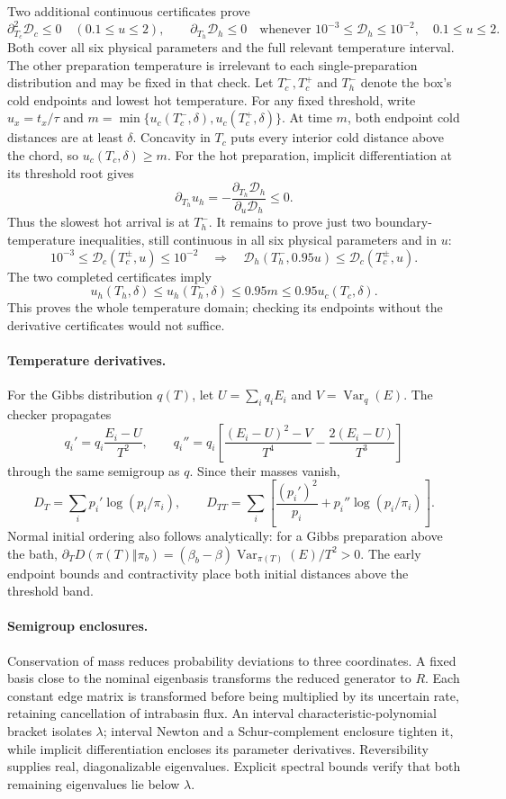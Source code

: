 Two additional continuous certificates prove
\[
 \partial_{T_c}^2\mathcal D_c\leq0
 \quad(0.1\leq u\leq2),\qquad
 \partial_{T_h}\mathcal D_h\leq0
 \quad\text{whenever }10^{-3}\leq\mathcal D_h\leq10^{-2},
 \quad0.1\leq u\leq2.
\]
Both cover all six physical parameters and the full relevant temperature
interval. The other preparation temperature is irrelevant to each
single-preparation distribution and may be fixed in that check.
Let $T_c^-,T_c^+$ and $T_h^-$ denote the box's cold endpoints and lowest
hot temperature. For any fixed threshold, write $u_x=t_x/\tau$ and
$m=\min\{u_c(T_c^-,\delta),u_c(T_c^+,\delta)\}$.
At time $m$, both endpoint cold distances are at least $\delta$.
Concavity in $T_c$ puts every interior cold distance above the chord,
so $u_c(T_c,\delta)\geq m$. For the hot preparation, implicit
 differentiation at its threshold root gives
\[
 \partial_{T_h}u_h=-\frac{\partial_{T_h}\mathcal D_h}
                              {\partial_u\mathcal D_h}\leq0.
\]
Thus the slowest hot arrival is at $T_h^-$. It remains to prove just two
boundary-temperature inequalities, still continuous in all six physical
parameters and in $u$:
\[
 10^{-3}\leq\mathcal D_c(T_c^\pm,u)\leq10^{-2}
 \quad\Longrightarrow\quad
 \mathcal D_h(T_h^-,0.95u)\leq\mathcal D_c(T_c^\pm,u).
\]
The two completed certificates imply
\[
 u_h(T_h,\delta)\leq u_h(T_h^-,\delta)
 \leq0.95m\leq0.95u_c(T_c,\delta).
\]
This proves the whole temperature domain; checking its endpoints without
the derivative certificates would not suffice.

\paragraph{Temperature derivatives.}
For the Gibbs distribution $q(T)$, let $U=\sum_iq_iE_i$ and
$V=\operatorname{Var}_q(E)$. The checker propagates
\[
 q_i'=q_i\frac{E_i-U}{T^2},\qquad
 q_i''=q_i\left[\frac{(E_i-U)^2-V}{T^4}
                      -\frac{2(E_i-U)}{T^3}\right]
\]
through the same semigroup as $q$. Since their masses vanish,
\[
 D_T=\sum_i p_i'\log(p_i/\pi_i),\qquad
 D_{TT}=\sum_i\left[\frac{(p_i')^2}{p_i}
                         +p_i''\log(p_i/\pi_i)\right].
\]
Normal initial ordering also follows analytically: for a Gibbs preparation
above the bath, $\partial_T D(\pi(T)\Vert\pi_b)
=(\beta_b-\beta)\operatorname{Var}_{\pi(T)}(E)/T^2>0$.
The early endpoint bounds and contractivity place both initial distances
above the threshold band.

\paragraph{Semigroup enclosures.}
Conservation of mass reduces probability deviations to three coordinates.
A fixed basis close to the nominal eigenbasis transforms the reduced
generator to $R$. Each constant edge matrix is transformed before being
multiplied by its uncertain rate, retaining cancellation of intrabasin
flux. An interval characteristic-polynomial bracket isolates $\lambda$;
interval Newton and a Schur-complement enclosure tighten it, while
implicit differentiation encloses its parameter derivatives.
Reversibility supplies real, diagonalizable eigenvalues. Explicit
spectral bounds verify that both remaining eigenvalues lie below $\lambda$.

